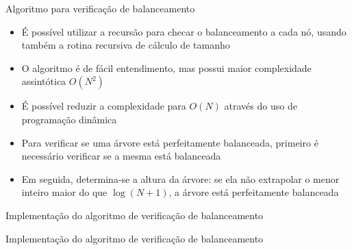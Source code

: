 \begin{frame}[fragile]{Algoritmo para verificação de balanceamento}

	\begin{itemize}
        \item É possível utilizar a recursão para checar o balanceamento a cada nó,
            usando também a rotina recursiva de cálculo de tamanho

        \item O algoritmo é de fácil entendimento, mas possui maior complexidade
            assintótica $O(N^2)$
	
        \item É possível reduzir a complexidade para $O(N)$ através do uso de programação dinâmica

        \item Para verificar se uma árvore está perfeitamente balanceada, primeiro é 
                necessário verificar se a mesma está balanceada

        \item Em seguida, determina-se a altura da árvore: se ela não extrapolar o menor inteiro 
            maior do que $\log(N + 1)$, a árvore está perfeitamente balanceada
	\end{itemize}

\end{frame}

\begin{frame}[fragile]{Implementação do algoritmo de verificação de balanceamento}
\end{frame}

\begin{frame}[fragile]{Implementação do algoritmo de verificação de balanceamento}
\end{frame}
